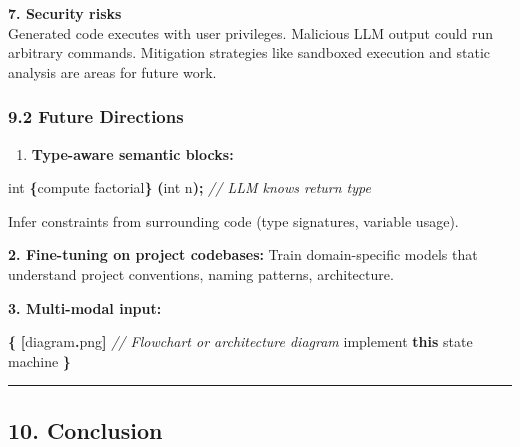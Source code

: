 \documentclass[11pt, a4paper]{article}
\providecommand{\tightlist}{\setlength{\itemsep}{0pt}\setlength{\parskip}{0pt}}
\newenvironment{Shaded}{\begin{snugshade}}{\end{snugshade}}
\newcommand{\CommentTok}[1]{\textcolor[rgb]{0.56,0.35,0.01}{\textit{#1}}}
\newcommand{\DataTypeTok}[1]{\textcolor[rgb]{0.13,0.29,0.53}{#1}}
\newcommand{\ErrorTok}[1]{\textcolor[rgb]{0.64,0.00,0.00}{\textbf{#1}}}
\newcommand{\KeywordTok}[1]{\textcolor[rgb]{0.13,0.29,0.53}{\textbf{#1}}}
\newcommand{\NormalTok}[1]{#1}
\newcommand{\OperatorTok}[1]{\textcolor[rgb]{0.81,0.36,0.00}{\textbf{#1}}}
\begin{document}
\textbf{7. Security risks}\\
Generated code executes with user privileges. Malicious LLM output could
run arbitrary commands. Mitigation strategies like sandboxed execution
and static analysis are areas for future work.

\subsubsection{9.2 Future Directions}\label{future-directions}

\begin{enumerate}
\def\labelenumi{\arabic{enumi}.}
\tightlist
\item
  \textbf{Type-aware semantic blocks:}
\end{enumerate}

\begin{Shaded}
\begin{Highlighting}[]
\DataTypeTok{int} \ErrorTok{$$}\OperatorTok{\{}\NormalTok{compute factorial}\OperatorTok{\}}\ErrorTok{$$} \OperatorTok{(}\DataTypeTok{int}\NormalTok{ n}\OperatorTok{);}  \CommentTok{// LLM knows return type}
\end{Highlighting}
\end{Shaded}

Infer constraints from surrounding code (type signatures, variable
usage).

\textbf{2. Fine-tuning on project codebases:} Train domain-specific
models that understand project conventions, naming patterns,
architecture.

\textbf{3. Multi-modal input:}

\begin{Shaded}
\begin{Highlighting}[]
\ErrorTok{$$}\OperatorTok{\{}
    \OperatorTok{[}\NormalTok{diagram}\OperatorTok{.}\NormalTok{png}\OperatorTok{]}  \CommentTok{// Flowchart or architecture diagram}
\NormalTok{    implement }\KeywordTok{this}\NormalTok{ state machine}
\OperatorTok{\}}\ErrorTok{$$}
\end{Highlighting}
\end{Shaded}

\begin{center}\rule{0.5\linewidth}{0.5pt}\end{center}

\subsection{10. Conclusion}\label{conclusion}
\end{document}
